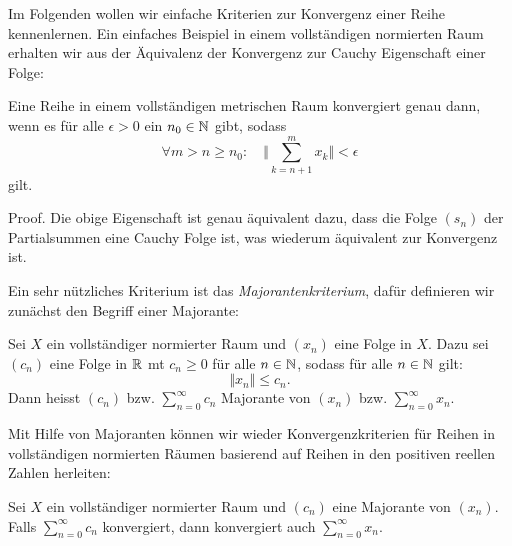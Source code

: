 Im Folgenden wollen wir einfache Kriterien zur Konvergenz einer Reihe kennenlernen. Ein einfaches Beispiel in einem vollständigen normierten Raum erhalten wir aus der Äquivalenz der Konvergenz zur Cauchy Eigenschaft einer Folge:
\label{metrik/reihen:theorem-3}
\begin{theorem}{}{}



Eine Reihe in einem vollständigen metrischen Raum konvergiert genau dann, wenn es für alle \(\epsilon > 0\) ein \(n_0 \in \mathbb{N}\) gibt, sodass
\begin{equation*}
 \forall m > n \geq n_0: \quad \Vert \sum_{k=n+1}^m x_k \Vert < \epsilon
\end{equation*}
gilt.
\end{theorem}

\begin{emphBox}{}{}
Proof.  Die obige Eigenschaft ist genau äquivalent dazu, dass die Folge \((s_n)\) der Partialsummen eine Cauchy Folge ist, was wiederum äquivalent zur Konvergenz ist.
\end{emphBox}

Ein sehr nützliches Kriterium ist das \emph{Majorantenkriterium}, dafür definieren wir zunächst den Begriff einer Majorante:
\label{metrik/reihen:definition-4}
\begin{definition}{}{}



Sei \(X\) ein vollständiger normierter Raum und \((x_n)\) eine Folge in \(X\). Dazu sei \((c_n)\) eine Folge in \(\mathbb{R}\) mt \(c_n \geq 0\) für alle \(n \in \mathbb{N}\), sodass für alle \(n \in \mathbb{N}\) gilt:
\begin{equation*}
 \Vert x_n \Vert \leq c_n .
\end{equation*}
Dann heisst \((c_n)\) bzw. \(\sum_{n=0}^\infty c_n\) Majorante von \((x_n)\) bzw. \(\sum_{n=0}^\infty x_n\).
\end{definition}

Mit Hilfe von Majoranten können wir wieder Konvergenzkriterien für Reihen in vollständigen normierten Räumen basierend auf Reihen in den positiven reellen Zahlen herleiten:
\label{metrik/reihen:theorem-5}
\begin{theorem}{}{}



Sei \(X\) ein vollständiger normierter Raum und \((c_n)\) eine Majorante von \((x_n)\). Falls \(\sum_{n=0}^\infty c_n\) konvergiert, dann konvergiert auch \(\sum_{n=0}^\infty x_n\).
\end{theorem}

